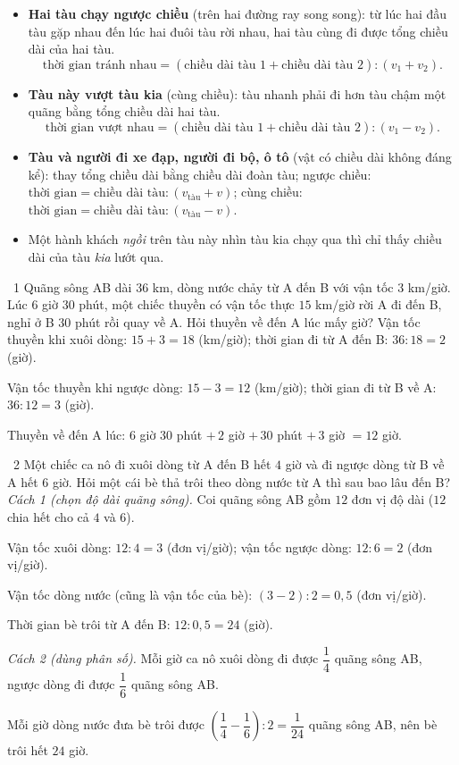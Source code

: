 \gap
{}
\begin{knowbox}\begin{itemize}[leftmargin=1.4em,itemsep=3pt]
\item \textbf{Hai tàu chạy ngược chiều} (trên hai đường ray song song): từ lúc hai đầu tàu gặp nhau đến lúc hai đuôi tàu rời nhau, hai tàu cùng đi được tổng chiều dài của hai tàu.
\[\text{thời gian tránh nhau}=(\text{chiều dài tàu 1}+\text{chiều dài tàu 2}):(v_1+v_2).\]
\item \textbf{Tàu này vượt tàu kia} (cùng chiều): tàu nhanh phải đi hơn tàu chậm một quãng bằng tổng chiều dài hai tàu.
\[\text{thời gian vượt nhau}=(\text{chiều dài tàu 1}+\text{chiều dài tàu 2}):(v_1-v_2).\]
\item \textbf{Tàu và người đi xe đạp, người đi bộ, ô tô} (vật có chiều dài không đáng kể): thay tổng chiều dài bằng chiều dài đoàn tàu;
ngược chiều: $\text{thời gian}=\text{chiều dài tàu}:(v_{\text{tàu}}+v)$; cùng chiều: $\text{thời gian}=\text{chiều dài tàu}:(v_{\text{tàu}}-v)$.
\item Một hành khách \emph{ngồi} trên tàu này nhìn tàu kia chạy qua thì chỉ thấy chiều dài của tàu \emph{kia} lướt qua.
\end{itemize}\end{knowbox}
\gap
\begin{exbox}{\ExWord\ 1}
Quãng sông AB dài $36$ km, dòng nước chảy từ A đến B với vận tốc $3$ km/giờ. Lúc $6$ giờ $30$ phút, một chiếc thuyền có vận tốc thực $15$ km/giờ rời A đi đến B, nghỉ ở B $30$ phút rồi quay về A. Hỏi thuyền về đến A lúc mấy giờ?
\guide
Vận tốc thuyền khi xuôi dòng: $15+3=18$ (km/giờ); thời gian đi từ A đến B: $36:18=2$ (giờ).\par
Vận tốc thuyền khi ngược dòng: $15-3=12$ (km/giờ); thời gian đi từ B về A: $36:12=3$ (giờ).\par
Thuyền về đến A lúc: $6$ giờ $30$ phút $+\,2$ giờ $+\,30$ phút $+\,3$ giờ $=12$ giờ.
\end{exbox}
\gap
\begin{exbox}{\ExWord\ 2}
Một chiếc ca nô đi xuôi dòng từ A đến B hết $4$ giờ và đi ngược dòng từ B về A hết $6$ giờ. Hỏi một cái bè thả trôi theo dòng nước từ A thì sau bao lâu đến B?
\guide
\textit{Cách 1 (chọn độ dài quãng sông).} Coi quãng sông AB gồm $12$ đơn vị độ dài ($12$ chia hết cho cả $4$ và $6$).\par
Vận tốc xuôi dòng: $12:4=3$ (đơn vị/giờ); vận tốc ngược dòng: $12:6=2$ (đơn vị/giờ).\par
Vận tốc dòng nước (cũng là vận tốc của bè): $(3-2):2=0{,}5$ (đơn vị/giờ).\par
Thời gian bè trôi từ A đến B: $12:0{,}5=24$ (giờ).\par\smallskip
\textit{Cách 2 (dùng phân số).} Mỗi giờ ca nô xuôi dòng đi được $\dfrac14$ quãng sông AB, ngược dòng đi được $\dfrac16$ quãng sông AB.\par
Mỗi giờ dòng nước đưa bè trôi được $\left(\dfrac14-\dfrac16\right):2=\dfrac1{24}$ quãng sông AB, nên bè trôi hết $24$ giờ.
\end{exbox}
